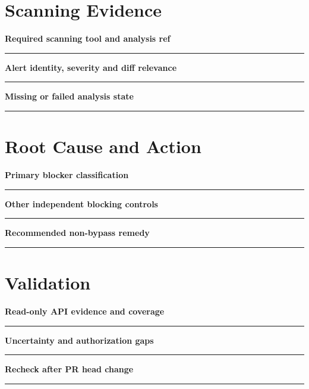 \documentclass[11pt,letterpaper]{article}
\begin{document}
\section{Scanning Evidence}
\noindent\textbf{Required scanning tool and analysis ref}\par
\vspace{1.1em}\noindent\rule{0.96\linewidth}{0.4pt}\par\vspace{0.65em}
\noindent\textbf{Alert identity, severity and diff relevance}\par
\vspace{1.1em}\noindent\rule{0.96\linewidth}{0.4pt}\par\vspace{0.65em}
\noindent\textbf{Missing or failed analysis state}\par
\vspace{1.1em}\noindent\rule{0.96\linewidth}{0.4pt}\par\vspace{0.65em}
\section{Root Cause and Action}
\noindent\textbf{Primary blocker classification}\par
\vspace{1.1em}\noindent\rule{0.96\linewidth}{0.4pt}\par\vspace{0.65em}
\noindent\textbf{Other independent blocking controls}\par
\vspace{1.1em}\noindent\rule{0.96\linewidth}{0.4pt}\par\vspace{0.65em}
\noindent\textbf{Recommended non-bypass remedy}\par
\vspace{1.1em}\noindent\rule{0.96\linewidth}{0.4pt}\par\vspace{0.65em}
\section{Validation}
\noindent\textbf{Read-only API evidence and coverage}\par
\vspace{1.1em}\noindent\rule{0.96\linewidth}{0.4pt}\par\vspace{0.65em}
\noindent\textbf{Uncertainty and authorization gaps}\par
\vspace{1.1em}\noindent\rule{0.96\linewidth}{0.4pt}\par\vspace{0.65em}
\noindent\textbf{Recheck after PR head change}\par
\vspace{1.1em}\noindent\rule{0.96\linewidth}{0.4pt}\par\vspace{0.65em}
\end{document}
